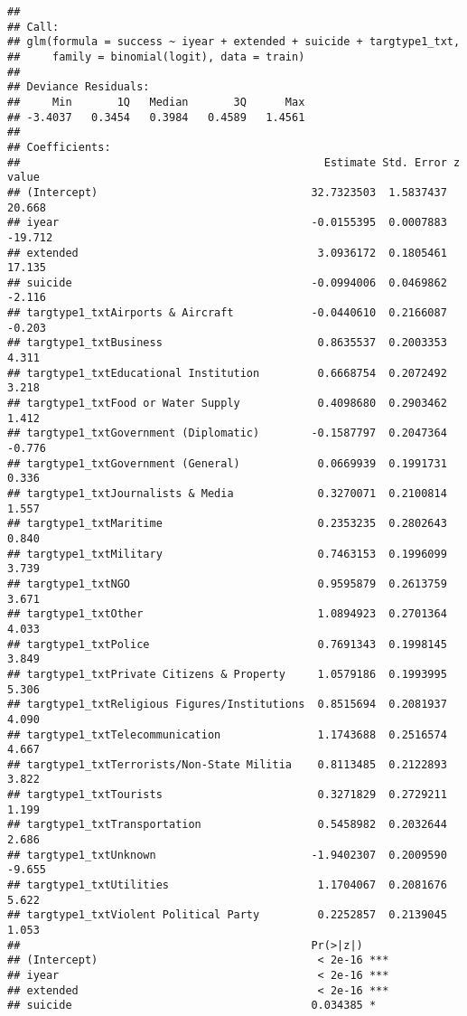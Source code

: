 \documentclass[11pt,letterpaper,]{article}
\theoremstyle{definition}
\theoremstyle{definition}
\theoremstyle{definition}
\theoremstyle{remark}
\begin{document}
\begin{verbatim}
## 
## Call:
## glm(formula = success ~ iyear + extended + suicide + targtype1_txt, 
##     family = binomial(logit), data = train)
## 
## Deviance Residuals: 
##     Min       1Q   Median       3Q      Max  
## -3.4037   0.3454   0.3984   0.4589   1.4561  
## 
## Coefficients:
##                                               Estimate Std. Error z value
## (Intercept)                                 32.7323503  1.5837437  20.668
## iyear                                       -0.0155395  0.0007883 -19.712
## extended                                     3.0936172  0.1805461  17.135
## suicide                                     -0.0994006  0.0469862  -2.116
## targtype1_txtAirports & Aircraft            -0.0440610  0.2166087  -0.203
## targtype1_txtBusiness                        0.8635537  0.2003353   4.311
## targtype1_txtEducational Institution         0.6668754  0.2072492   3.218
## targtype1_txtFood or Water Supply            0.4098680  0.2903462   1.412
## targtype1_txtGovernment (Diplomatic)        -0.1587797  0.2047364  -0.776
## targtype1_txtGovernment (General)            0.0669939  0.1991731   0.336
## targtype1_txtJournalists & Media             0.3270071  0.2100814   1.557
## targtype1_txtMaritime                        0.2353235  0.2802643   0.840
## targtype1_txtMilitary                        0.7463153  0.1996099   3.739
## targtype1_txtNGO                             0.9595879  0.2613759   3.671
## targtype1_txtOther                           1.0894923  0.2701364   4.033
## targtype1_txtPolice                          0.7691343  0.1998145   3.849
## targtype1_txtPrivate Citizens & Property     1.0579186  0.1993995   5.306
## targtype1_txtReligious Figures/Institutions  0.8515694  0.2081937   4.090
## targtype1_txtTelecommunication               1.1743688  0.2516574   4.667
## targtype1_txtTerrorists/Non-State Militia    0.8113485  0.2122893   3.822
## targtype1_txtTourists                        0.3271829  0.2729211   1.199
## targtype1_txtTransportation                  0.5458982  0.2032644   2.686
## targtype1_txtUnknown                        -1.9402307  0.2009590  -9.655
## targtype1_txtUtilities                       1.1704067  0.2081676   5.622
## targtype1_txtViolent Political Party         0.2252857  0.2139045   1.053
##                                             Pr(>|z|)    
## (Intercept)                                  < 2e-16 ***
## iyear                                        < 2e-16 ***
## extended                                     < 2e-16 ***
## suicide                                     0.034385 *  

\end{verbatim}
\end{document}
